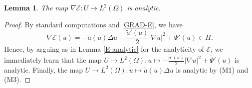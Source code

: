 \documentclass[11pt,reqno]{amsart}
\newtheorem{theorem}{Theorem}[section]
\newtheorem{lemma}[theorem]{Lemma}
\theoremstyle{remark}
\newcommand \norm[1] {\left\Vert #1\right\Vert}
\def\R{\mathbb{R}}
\def\E{\mathcal{E}}
\numberwithin{equation}{section}
\begin{document}
%
%

\begin{lemma} The map $\nabla \E:U\to L^2(\Omega)$
is analytic.
\end{lemma}
\begin{proof} By standard computations and \eqref{GRAD-E}, we have
$$
\nabla \E(u)=-\widetilde{a}(u)\Delta u-\frac{\widetilde{a}'(u)}{2} |\nabla u|^2+\widetilde{\Psi}'(u)\in H.
$$
Hence, by arguing as in Lemma \ref{E-analytic} for the analyticity of $\E$, we immediately learn that the map
$U\to L^2(\Omega): u\mapsto -\frac{\widetilde{a}'(u)}{2} |\nabla u|^2+\widetilde{\Psi}'(u)$
is analytic.
Finally,
the map $U \to L^2(\Omega): u\mapsto \widetilde{a}(u)\Delta u$ is analytic by (M1) and (M3).
\end{proof}
\end{document}
